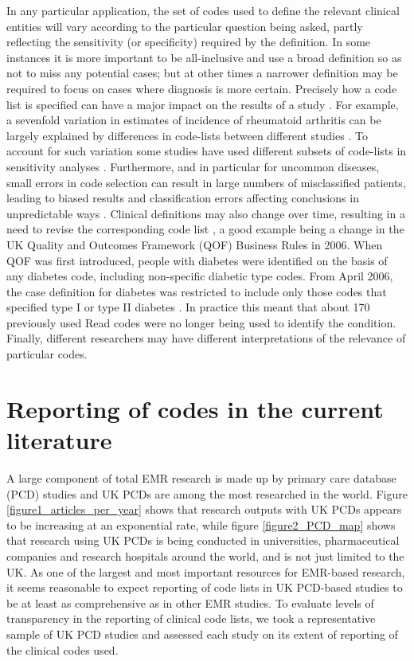\documentclass[10pt]{article}
\begin{document}
In any particular application, the set of codes used to define the relevant clinical entities will vary according to the particular question being asked, partly reflecting the sensitivity (or specificity) required by the definition. In some instances it is more important to be all-inclusive and use a broad definition so as not to miss any potential cases; but at other times a narrower definition may be required to focus on cases where diagnosis is more certain.  Precisely how a code list is specified can have a major impact on the results of a study \cite{Nicholson2011}. For example, a sevenfold variation in estimates of incidence of rheumatoid arthritis can be largely explained by differences in code-lists between different studies \cite{Garcia2009, Watson2003}.  To account for such variation some studies have used different subsets of code-lists in sensitivity analyses \cite{Doran2011, Herrett2010}.  Furthermore, and in particular for uncommon diseases, small errors in code selection can result in large numbers of misclassified patients, leading to biased results and classification errors affecting conclusions in unpredictable ways \cite{Manuel2010}. Clinical definitions may also change over time, resulting in a need to revise the corresponding code list \cite{Gulliford2009}, a good example being a change in the UK Quality and Outcomes Framework (QOF) Business Rules in 2006. When QOF was first introduced, people with diabetes were identified on the basis of any diabetes code, including non-specific diabetic type codes.  From April 2006, the case definition for diabetes was restricted to include only those codes that specified type I or type II diabetes \cite{Hippisley-Cox2006}.  In practice this meant that about 170 previously used Read codes were no longer being used to identify the condition. Finally, different researchers may have different interpretations of the relevance of particular codes.

\section*{Reporting of codes in the current literature}

A large component of total EMR research is made up by primary care database (PCD) studies and UK PCDs are among the most researched in the world.  Figure \ref{figure1_articles_per_year} shows that research outputs with UK PCDs appears to be increasing at an exponential rate, while figure \ref{figure2_PCD_map} shows that research using UK PCDs is being conducted in universities, pharmaceutical companies and research hospitals around the world, and is not just limited to the UK.  As one of the largest and most important resources for EMR-based research, it seems reasonable to expect reporting of code lists in UK PCD-based studies to be at least as comprehensive as in other EMR studies.  To evaluate levels of transparency in the reporting of clinical code lists, we took a representative sample of UK PCD studies and assessed each study on its extent of reporting of the clinical codes used.
\end{document}
